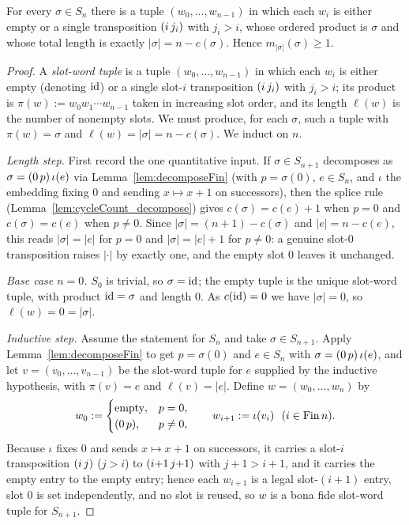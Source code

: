 \begin{lemma}\label{lem:exists_monotone}
\leanok
{}
For every $\sigma\in S_n$ there is a tuple $(w_0,\dots,w_{n-1})$ in which
each $w_i$ is either empty or a single transposition $(i\,j_i)$ with
$j_i>i$, whose ordered product is $\sigma$ and whose total length is
exactly $|\sigma|=n-c(\sigma)$. Hence $m_{|\sigma|}(\sigma)\ge1$.
\end{lemma}
\begin{proof}\leanok
{}
A \emph{slot-word tuple} is a tuple $(w_0,\dots,w_{n-1})$ in which each
$w_i$ is either empty (denoting $\mathrm{id}$) or a single slot-$i$ transposition
$(i\,j_i)$ with $j_i>i$; its product is $\pi(w):=w_0w_1\cdots w_{n-1}$
taken in increasing slot order, and its length $\ell(w)$ is the number of
nonempty slots. We must produce, for each $\sigma$, such a tuple with
$\pi(w)=\sigma$ and $\ell(w)=|\sigma|=n-c(\sigma)$. We induct on $n$.

\smallskip\noindent\emph{Length step.} First record the one quantitative input.
If $\sigma\in S_{n+1}$ decomposes as $\sigma=(0\,p)\,\iota(e)$ via
Lemma~\ref{lem:decomposeFin} (with $p=\sigma(0)$, $e\in S_n$, and $\iota$ the
embedding fixing $0$ and sending $x\mapsto x{+}1$ on successors), then the splice
rule (Lemma~\ref{lem:cycleCount_decompose}) gives $c(\sigma)=c(e)+1$ when $p=0$
and $c(\sigma)=c(e)$ when $p\neq0$. Since $|\sigma|=(n{+}1)-c(\sigma)$ and
$|e|=n-c(e)$, this reads $|\sigma|=|e|$ for $p=0$ and $|\sigma|=|e|+1$ for
$p\neq0$: a genuine slot-$0$ transposition raises $|\cdot|$ by exactly one, and
the empty slot $0$ leaves it unchanged.

\smallskip\noindent\emph{Base case $n=0$.} $S_0$ is trivial, so $\sigma=\mathrm{id}$; the
empty tuple is the unique slot-word tuple, with product $\mathrm{id}=\sigma$ and length
$0$. As $c(\mathrm{id})=0$ we have $|\sigma|=0$, so $\ell(w)=0=|\sigma|$.

\smallskip\noindent\emph{Inductive step.} Assume the statement for $S_n$ and take
$\sigma\in S_{n+1}$. Apply Lemma~\ref{lem:decomposeFin} to get $p=\sigma(0)$ and
$e\in S_n$ with $\sigma=(0\,p)\,\iota(e)$, and let $v=(v_0,\dots,v_{n-1})$ be
the slot-word tuple for $e$ supplied by the inductive hypothesis, with
$\pi(v)=e$ and $\ell(v)=|e|$. Define $w=(w_0,\dots,w_n)$ by
\[
  w_0:=\begin{cases}\text{empty}, & p=0,\\ (0\,p), & p\neq0,\end{cases}
  \qquad w_{i+1}:=\iota(v_i)\ \ (i\in\mathrm{Fin}\,n).
\]
Because $\iota$ fixes $0$ and sends $x\mapsto x{+}1$ on successors, it carries a
slot-$i$ transposition $(i\,j)$ ($j>i$) to $(i{+}1\,j{+}1)$ with
$j{+}1>i{+}1$, and it carries the empty entry to the empty entry; hence each
$w_{i+1}$ is a legal slot-$(i{+}1)$ entry, slot $0$ is set independently, and no
slot is reused, so $w$ is a bona fide slot-word tuple for $S_{n+1}$.


\end{proof}
